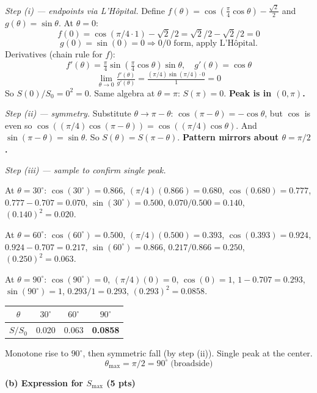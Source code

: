 \documentclass[11pt,letterpaper]{article}
\begin{document}
\textit{Step (i) --- endpoints via L'H\^opital.} Define $f(\theta) = \cos\!\left(\tfrac{\pi}{4}\cos\theta\right) - \tfrac{\sqrt{2}}{2}$ and $g(\theta) = \sin\theta$. At $\theta = 0$:
\[f(0) = \cos(\pi/4 \cdot 1) - \sqrt{2}/2 = \sqrt{2}/2 - \sqrt{2}/2 = 0\]
\[g(0) = \sin(0) = 0 \Rightarrow \text{0/0 form, apply L'H\^opital.}\]
Derivatives (chain rule for $f$):
\[f'(\theta) = \tfrac{\pi}{4}\sin\!\left(\tfrac{\pi}{4}\cos\theta\right)\sin\theta,\quad g'(\theta) = \cos\theta\]
\[\lim_{\theta\to 0}\tfrac{f'(\theta)}{g'(\theta)} = \tfrac{(\pi/4)\sin(\pi/4)\cdot 0}{1} = 0\]
So $S(0)/S_0 = 0^2 = 0$. Same algebra at $\theta = \pi$: $S(\pi) = 0$. \textbf{Peak is in $(0, \pi)$.}

\textit{Step (ii) --- symmetry.} Substitute $\theta \to \pi - \theta$: $\cos(\pi-\theta) = -\cos\theta$, but $\cos$ is even so $\cos((\pi/4)\cos(\pi-\theta)) = \cos((\pi/4)\cos\theta)$. And $\sin(\pi-\theta) = \sin\theta$. So $S(\theta) = S(\pi-\theta)$. \textbf{Pattern mirrors about $\theta = \pi/2$.}

\textit{Step (iii) --- sample to confirm single peak.}

At $\theta = 30^\circ$: $\cos(30^\circ) = 0.866$, $(\pi/4)(0.866) = 0.680$, $\cos(0.680) = 0.777$, $0.777-0.707 = 0.070$, $\sin(30^\circ) = 0.500$, $0.070/0.500 = 0.140$, $(0.140)^2 = \mathbf{0.020}$.

At $\theta = 60^\circ$: $\cos(60^\circ) = 0.500$, $(\pi/4)(0.500) = 0.393$, $\cos(0.393) = 0.924$, $0.924-0.707 = 0.217$, $\sin(60^\circ) = 0.866$, $0.217/0.866 = 0.250$, $(0.250)^2 = \mathbf{0.063}$.

At $\theta = 90^\circ$: $\cos(90^\circ) = 0$, $(\pi/4)(0) = 0$, $\cos(0) = 1$, $1-0.707 = 0.293$, $\sin(90^\circ) = 1$, $0.293/1 = 0.293$, $(0.293)^2 = \mathbf{0.0858}$.

\begin{center}
\begin{tabular}{cccc}
\toprule
$\theta$ & $30^\circ$ & $60^\circ$ & $90^\circ$\\
\midrule
$S/S_0$ & 0.020 & 0.063 & \textbf{0.0858}\\
\bottomrule
\end{tabular}
\end{center}
Monotone rise to $90^\circ$, then symmetric fall (by step (ii)). Single peak at the center.
\[\boxed{\theta_{\max} = \pi/2 = 90^\circ\;\text{(broadside)}}\]

\vspace{6pt}
\textbf{(b) Expression for $S_{\max}$ (5 pts)}
\end{document}
